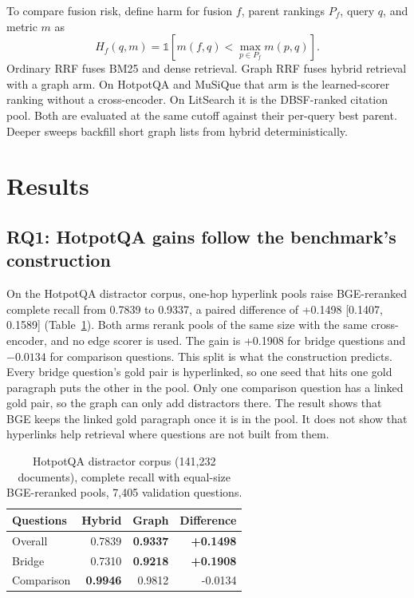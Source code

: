 \documentclass[10pt,twocolumn]{article}
\begin{document}
To compare fusion risk, define harm for fusion $f$, parent rankings $P_f$,
query $q$, and metric $m$ as
\begin{equation}
  H_f(q,m)=\mathbb{1}\!\left[m(f,q)<\max_{p\in P_f}m(p,q)\right].
\end{equation}
Ordinary RRF fuses BM25 and dense retrieval. Graph RRF fuses hybrid retrieval
with a graph arm. On HotpotQA and MuSiQue that arm is the learned-scorer
ranking without a cross-encoder. On LitSearch it is the DBSF-ranked citation
pool. Both are evaluated at the same cutoff against their per-query best
parent. Deeper sweeps backfill short graph lists from hybrid deterministically.

\section{Results}

\subsection{RQ1: HotpotQA gains follow the benchmark's construction}

On the HotpotQA distractor corpus, one-hop hyperlink pools raise BGE-reranked
complete recall from 0.7839 to 0.9337, a paired difference of +0.1498
[0.1407, 0.1589] (Table~\ref{tab:strong}). Both arms rerank pools of the same
size with the same cross-encoder, and no edge scorer is used. The gain is
+0.1908 for bridge questions and $-0.0134$ for comparison questions. This split
is what the construction predicts. Every bridge question's gold pair is
hyperlinked, so one seed that hits one gold paragraph puts the other in the
pool. Only one comparison question has a linked gold pair, so the graph can
only add distractors there. The result shows that BGE keeps the linked gold
paragraph once it is in the pool. It does not show that hyperlinks help
retrieval where questions are not built from them.

\begin{table}[t]
  \centering
  \caption{HotpotQA distractor corpus (141,232 documents), complete recall with
  equal-size BGE-reranked pools, 7,405 validation questions.}
  \label{tab:strong}
  \small
  \begin{tabular}{lrrr}
    \toprule
    Questions & Hybrid & Graph & Difference \\
    \midrule
    Overall & 0.7839 & \textbf{0.9337} & \textbf{+0.1498} \\
    Bridge & 0.7310 & \textbf{0.9218} & \textbf{+0.1908} \\
    Comparison & \textbf{0.9946} & 0.9812 & -0.0134 \\
    \bottomrule
  \end{tabular}
\end{table}
\end{document}
